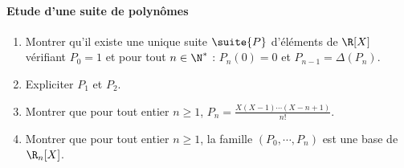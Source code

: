 \paragraph{Etude d'une suite de polynômes}
\begin{enumerate}
\item Montrer qu'il existe une unique suite $\suite{P}$ d'éléments de $\R[X]$ vérifiant $P_0=1$ et pour tout $n\in \N^*$ : $P_n(0)=0$ et $P_{n-1} =\Delta(P_n)$.
\item Expliciter $P_1$ et $P_2$.
\item Montrer que pour tout entier $n\geq1 $, $P_n = \frac{X (X-1) \cdots (X-n+1) }{n!}$.
\item Montrer que pour tout entier $n\geq 1$, la famille $(P_0, \cdots, P_n)$ est une base de $\R_n[X]$.
\end{enumerate}

 

